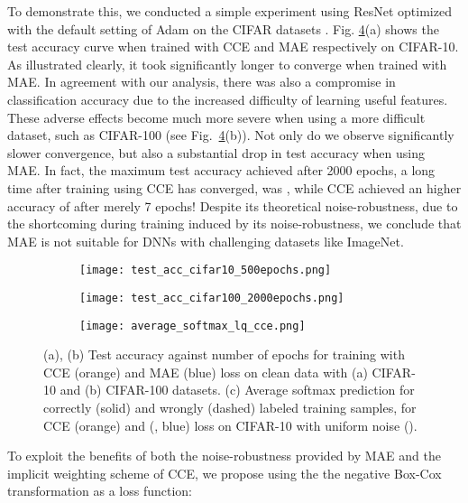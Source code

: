 \documentclass{article}
\begin{document}
To demonstrate this, we conducted a simple experiment using ResNet \cite{he2016deep} optimized with the default setting of Adam \cite{kingma2014adam} on the CIFAR datasets \cite{krizhevsky2009learning}. 
Fig. \ref{cce_mae}(a) shows the test accuracy curve when trained with CCE and MAE respectively on CIFAR-10. 
As illustrated clearly, it took significantly longer to converge when trained with MAE. 
In agreement with our analysis, there was also a compromise in classification accuracy due to the increased difficulty of learning useful features. 
These adverse effects become much more severe when using a more difficult dataset, such as CIFAR-100 (see Fig.~\ref{cce_mae}(b)). 
Not only do we observe significantly slower convergence, but also a substantial drop in test accuracy when using MAE. 
In fact, the maximum test accuracy achieved after 2000 epochs, a long time after training using CCE has converged, was , while CCE achieved an higher accuracy of  after merely 7 epochs! Despite its theoretical noise-robustness, due to the shortcoming during training induced by its noise-robustness, we conclude that MAE is not suitable for DNNs with challenging datasets like ImageNet.
\begin{figure}
\centering
\begin{subfigure}{.31\textwidth}
\centering
\texttt{[image: test\_acc\_cifar10\_500epochs.png]}
\label{fig:sfig2}
\caption{}
\end{subfigure}
\begin{subfigure}{.31\textwidth}
\centering
\texttt{[image: test\_acc\_cifar100\_2000epochs.png]}
\label{fig:sfig2}
\caption{}
\end{subfigure}
\begin{subfigure}{.31\textwidth}
\centering
\texttt{[image: average\_softmax\_lq\_cce.png]}
\label{fig:sfig2}
\caption{}
\end{subfigure}
\caption{(a), (b) Test accuracy against number of epochs for training with CCE (orange) and MAE (blue) loss on clean data with (a) CIFAR-10 and (b) CIFAR-100 datasets. (c) Average softmax prediction for correctly (solid) and wrongly (dashed) labeled training samples, for CCE (orange) and  (, blue) loss on CIFAR-10 with uniform noise ().}
\label{cce_mae}
\end{figure}

To exploit the benefits of both the noise-robustness provided by MAE and the implicit weighting scheme of CCE, we propose using the the negative Box-Cox transformation \cite{box1964analysis} as a loss function: 
\end{document}
